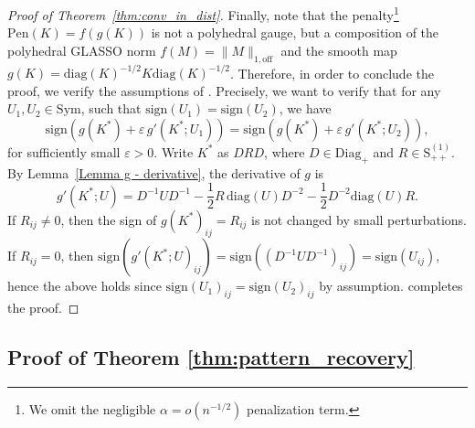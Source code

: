 \documentclass[12pt]{amsart}
\numberwithin{equation}{section}
\numberwithin{equation}{section}
\theoremstyle{plain}
\theoremstyle{definition}
\newcommand{\diag}[1]{\mathrm{diag}(#1)}
\newcommand{\Sppone}{\mathrm{S}_{++}^{(1)}}
\newcommand{\Sym}{\mathrm{Sym}}
\newcommand{\sign}{\mathrm{sign}}
\newcommand{\Diagp}{\mathrm{Diag}_+}
\begin{document}
\begin{proof}[Proof of Theorem~\ref{thm:conv_in_dist}]
Finally, note that the penalty\footnote{ We omit the negligible $\alpha=o(n^{-1/2})$ penalization term. } $\mathrm{Pen}(K)=f(g(K))$ is not a polyhedral gauge, but a composition of the polyhedral GLASSO norm $f(M)=\|M\|_{1, \text{off}}$ and the smooth map $g(K)=\diag{K}^{-1/2}K\diag{K}^{-1/2}$. Therefore, in order to conclude the proof, we verify the assumptions of \cite[Corollary A.1]{hejny2025asymptotic}. 
Precisely, we want to verify
that for any $U_1, U_2 \in \Sym$, such that $\sign(U_1)=\sign(U_2)$, we have  \begin{equation*}
    \sign(g(K^\ast)+\varepsilon\, g'(K^\ast;U_1))=\sign(g(K^\ast)+\varepsilon\, g'(K^\ast;U_2)),
\end{equation*}
for sufficiently small $\varepsilon>0$. Write $K^\ast$ as $DRD$, where $D\in\Diagp$ and $R\in\Sppone$. By Lemma~\ref{Lemma g - derivative}, the derivative of $g$ is
\begin{equation*}
g'(K^\ast;U) =  D^{-1} U D^{-1}-\frac{1}{2} R\, \mathrm{diag}(U) D^{-2}-\frac{1}{2} D^{-2}\mathrm{diag}(U) R.
\end{equation*}
If $R_{ij}\neq0$, then the sign of $g(K^\ast)_{ij}=R_{ij}$ is not changed by small perturbations. If $R_{ij}=0$, then $\sign(g'({K^\ast};U)_{ij})=\sign(( D^{-1} U D^{-1})_{ij})=\sign(U_{ij})$, hence the above holds since $\sign(U_1)_{ij}=\sign(U_2)_{ij}$ by assumption. \cite[Corollary A.1]{hejny2025asymptotic} completes the proof.
\end{proof}

\subsection{Proof of Theorem \ref{thm:pattern_recovery}}
\end{document}
